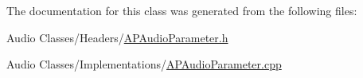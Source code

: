 The documentation for this class was generated from the following files\+:\begin{DoxyCompactItemize}
\item 
Audio Classes/\+Headers/\hyperlink{_a_p_audio_parameter_8h}{A\+P\+Audio\+Parameter.\+h}\item 
Audio Classes/\+Implementations/\hyperlink{_a_p_audio_parameter_8cpp}{A\+P\+Audio\+Parameter.\+cpp}\end{DoxyCompactItemize}
